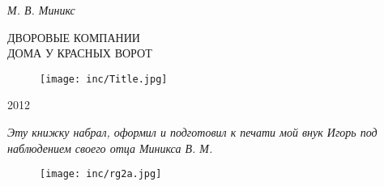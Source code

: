 
\thispagestyle{empty} 

\begin{center}

\vspace{35pt}

\textit{ \Large{ М. В. Миникс}}

\vfill

\large ДВОРОВЫЕ КОМПАНИИ \\ ДОМА У КРАСНЫХ ВОРОТ

\vfill

\begin{figure}[ht]
  \centering
  \texttt{[image: inc/Title.jpg]}
\end{figure}

\vfill

2012

\end{center}

\newpage

\thispagestyle{empty} 



\vspace*{70pt}

\noindent
\begin{center}
\begin{minipage}{65mm}
\textit{Эту книжку набрал, оформил и подготовил к печати мой внук Игорь  под наблюдением своего отца Миникса В. М.}
\end{minipage}
\end{center}

\vspace{49pt}

\begin{figure}[h!]
  \centering
  \texttt{[image: inc/rg2a.jpg]}
\end{figure}

\newpage
